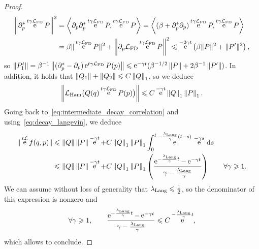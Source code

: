 \documentclass[11pt,a4paper]{article}
\DeclareMathOperator{\e}{e}
\renewcommand{\d}{\mathrm d}
\theoremstyle{plain}
\numberwithin{equation}{section}
\renewcommand{\leq}{\leqslant}
\renewcommand{\geq}{\geqslant}
\begin{document}
\begin{proof}
    \begin{align*}
        \norm{\partial_p^* \e^{t \gamma \mathcal L_{\rm FD}} P}^2
        &= \ip{\partial_p \partial_p^*\e^{t \gamma \mathcal L_{\rm FD}} P}{\e^{t \gamma \mathcal L_{\rm FD}} P}
        = \ip{(\beta  + \partial_{p}^* \partial_p) \e^{t \gamma \mathcal L_{\rm FD}} P}{\e^{t \gamma \mathcal L_{\rm FD}} P} \\
        &= \beta \norm*{\e^{t \gamma \mathcal L_{\rm FD}} P}^2 + \norm{\partial_p \mathcal L_{\rm FD} \e^{t \gamma \mathcal L_{\rm FD}} P}^2
        \leq \e^{-2\gamma t} \left( \beta \norm*{P}^2 + \norm*{P'}^2 \right),
    \end{align*}
    so $\norm{P^t_1} = \beta^{-1} \norm{ (\partial_p^* - \partial_p) \e^{t \gamma \mathcal L_{\rm FD}} P(p)} \leq \e^{- \gamma t} (\beta^{-1/2}\norm{P} +  2\beta^{-1}\norm{P'})$.
    In addition, it holds that $\norm{Q_1} + \norm{Q_2} \leq C \norm{Q}_1$,
    so we deduce
    \[
        \norm{\mathcal L_{\rm Ham} \bigl(Q(q) \e^{t \gamma \mathcal L_{\rm FD}} P(p)\bigr)}
        \leq C \e^{-\gamma t} \norm{Q}_1 \norm{P}_1.
    \]
    Going back to~\eqref{eq:intermediate_decay_correlation} and using~\eqref{eq:decay_langevin}, we deduce
    \begin{align*}
        \norm*{ \e^{t \mathcal L} f(q,p) }
        &\leq \norm{Q} \norm{P} \e^{-\gamma t}
        + C \norm{Q}_1 \norm{P}_1 \int_{0}^{t} \e^{-\frac{\lambda_{\rm Lang}}{\gamma}(t-s)}  \, \e^{-\gamma s} \, \d s \\
        &\leq \norm{Q} \norm{P} \e^{-\gamma t}
        + C \norm{Q}_1 \norm{P}_1
        \left( \frac{\e^{- \frac{\lambda_{\rm Lang}}{\gamma}t} - \e^{- \gamma t}}{\gamma - \frac{\lambda_{\rm Lang}}{\gamma}} \right) \qquad \forall \gamma \geq 1.
    \end{align*}
    We can assume without loss of generality that $\lambda_{\rm Lang} \leq \frac{1}{2}$,
    so the denominator of this expression is nonzero and
    \[
        \forall \gamma \geq  1, \qquad
        \frac{\e^{- \frac{\lambda_{\rm Lang}}{\gamma} t} - \e^{- \gamma t}}{\gamma - \frac{\lambda_{\rm Lang}}{\gamma}}
        \leq C \e^{-\frac{\lambda_{\rm Lang}}{\gamma} t},
    \]
    which allows to conclude.
    \end{proof}
\end{document}
